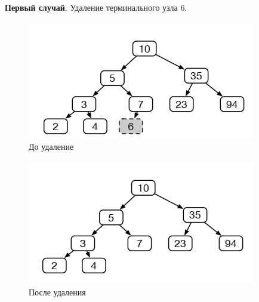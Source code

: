 \documentclass{beamer}
\begin{document}
\begin{frame}[fragile]
	\textbf{Первый случай}. Удаление терминального узла 6.
	\begin{figure}[h]
		\centering
		\includegraphics[scale=0.5]{images/lec07-pic05.png}
		\caption{До удаление}
	\end{figure}
	\begin{figure}[h]
		\centering
		\includegraphics[scale=0.5]{images/lec07-pic06.png}
		\caption{После удаления}
	\end{figure}	
\end{frame}
\end{document}

